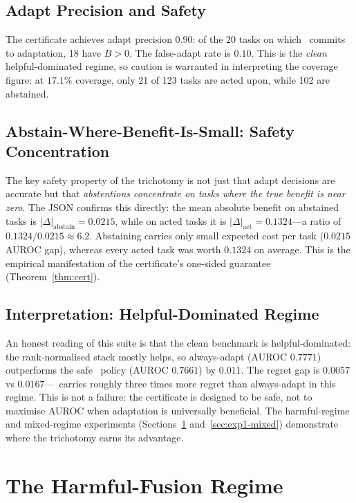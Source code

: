 \subsection{Adapt Precision and Safety}

The certificate achieves adapt precision $0.90$: of the 20 tasks on which \KGA\ commits to
adaptation, 18 have $B > 0$.  The false-adapt rate is $0.10$.  This is the \emph{clean}
helpful-dominated regime, so caution is warranted in interpreting the coverage figure: at
$17.1\%$ coverage, only 21 of 123 tasks are acted upon, while 102 are abstained.

\subsection{Abstain-Where-Benefit-Is-Small: Safety Concentration}

The key safety property of the trichotomy is not just that adapt decisions are accurate but
that \emph{abstentions concentrate on tasks where the true benefit is near zero}.  The JSON
confirms this directly: the mean absolute benefit on abstained tasks is $|\Delta|_\text{abstain}
= 0.0215$, while on acted tasks it is $|\Delta|_\text{act} = 0.1324$---a ratio of
$0.1324 / 0.0215 \approx 6.2$.  Abstaining carries only small expected cost per task
($0.0215$ AUROC gap), whereas every acted task was worth $0.1324$ on average.  This is the
empirical manifestation of the certificate's one-sided guarantee (Theorem~\ref{thm:cert}).

\subsection{Interpretation: Helpful-Dominated Regime}

An honest reading of this suite is that the clean benchmark is helpful-dominated: the
rank-normalised stack mostly helps, so always-adapt (AUROC $0.7771$) outperforms the safe
\KGA\ policy (AUROC $0.7661$) by $0.011$.  The regret gap is $0.0057$ vs $0.0167$---\KGA\
carries roughly three times more regret than always-adapt in this regime.  This is not a
failure: the certificate is designed to be safe, not to maximise AUROC when adaptation is
universally beneficial.  The harmful-regime and mixed-regime experiments
(Sections~\ref{sec:exp1-harmful} and~\ref{sec:exp1-mixed}) demonstrate where the
trichotomy earns its advantage.

\section{The Harmful-Fusion Regime}
\label{sec:exp1-harmful}

